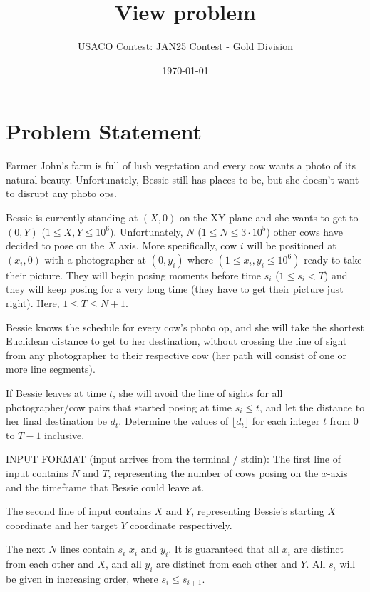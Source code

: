 \documentclass[12pt]{article}
\title{View problem}
\author{USACO Contest: JAN25 Contest - Gold Division}
\date{\today}
\begin{document}
\maketitle

\section*{Problem Statement}


Farmer John's farm is full of lush vegetation and every cow wants a photo of its
natural beauty. Unfortunately, Bessie still has places to be, but she doesn't
want to disrupt any  photo ops. 

Bessie is currently standing at $(X,0)$ on the XY-plane and she wants to get to
$(0,Y)$ ($1\le X,Y\le 10^6$). Unfortunately, $N$ ($1 \leq N \leq 3 \cdot 10^5$)
other cows have decided to pose on the $X$ axis. More specifically, cow $i$ will
be positioned at $(x_i,0)$ with a photographer at $(0,y_i)$ where
$(1 \leq x_i,y_i \leq 10^6)$ ready to take their picture. They will begin posing
moments before time $s_i$ ($1 \leq s_i < T$) and they will keep posing for a
very long time (they have to get their picture just right). Here,
$1\le T\le N+1$.

Bessie knows the schedule for every cow's photo op, and she will take the
shortest Euclidean distance to get to her destination, without crossing the line
of sight from any photographer to their respective cow (her path will consist of
one or more line segments).

If Bessie leaves at time $t$, she will avoid the line of sights for all 
photographer/cow pairs that started posing at time $s_i \le t$, and let  the
distance to her final destination be $d_t$. Determine the values of 
$\lfloor d_t\rfloor$ for each integer $t$ from $0$ to $T-1$ inclusive.

INPUT FORMAT (input arrives from the terminal / stdin):
The first line of input contains $N$ and $T$, representing the number of cows
posing on the $x$-axis and the timeframe that Bessie could leave at.

The second line of input contains $X$ and $Y$, representing Bessie's starting $X$
coordinate and her target $Y$ coordinate respectively.

The next $N$ lines contain $s_i$ $x_i$ and $y_i$. It is guaranteed that all
$x_i$ are distinct from each other and $X$, and all $y_i$ are distinct from each
other and $Y$. All $s_i$ will be given in increasing order, where
$s_i \leq s_{i+1}$.
\end{document}
